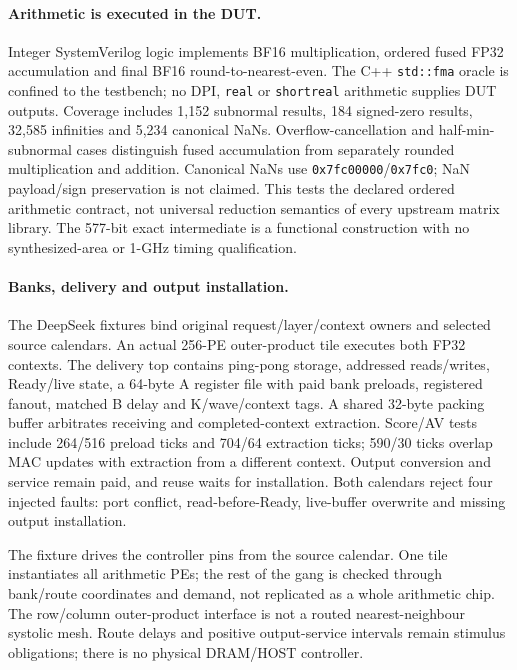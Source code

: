 \paragraph{Arithmetic is executed in the DUT.}
Integer SystemVerilog logic implements BF16 multiplication, ordered fused FP32 accumulation and final BF16 round-to-nearest-even. The C++ \texttt{std::fma} oracle is confined to the testbench; no DPI, \texttt{real} or \texttt{shortreal} arithmetic supplies DUT outputs. Coverage includes 1,152 subnormal results, 184 signed-zero results, 32,585 infinities and 5,234 canonical NaNs. Overflow-cancellation and half-min-subnormal cases distinguish fused accumulation from separately rounded multiplication and addition. Canonical NaNs use \texttt{0x7fc00000}/\texttt{0x7fc0}; NaN payload/sign preservation is not claimed. This tests the declared ordered arithmetic contract, not universal reduction semantics of every upstream matrix library. The 577-bit exact intermediate is a functional construction with no synthesized-area or 1-GHz timing qualification.

\paragraph{Banks, delivery and output installation.}
The DeepSeek fixtures bind original request/layer/context owners and selected source calendars.
An actual 256-PE outer-product tile executes both FP32 contexts.
The delivery top contains ping-pong storage, addressed reads/writes, Ready/live state, a 64-byte A register file with paid bank preloads, registered fanout, matched B delay and K/wave/context tags.
A shared 32-byte packing buffer arbitrates receiving and completed-context extraction.
Score/AV tests include 264/516 preload ticks and 704/64 extraction ticks; 590/30 ticks overlap MAC updates with extraction from a different context.
Output conversion and service remain paid, and reuse waits for installation.
Both calendars reject four injected faults: port conflict, read-before-Ready, live-buffer overwrite and missing output installation.

The fixture drives the controller pins from the source calendar.
One tile instantiates all arithmetic PEs; the rest of the gang is checked through bank/route coordinates and demand, not replicated as a whole arithmetic chip.
The row/column outer-product interface is not a routed nearest-neighbour systolic mesh.
Route delays and positive output-service intervals remain stimulus obligations; there is no physical DRAM/HOST controller.

